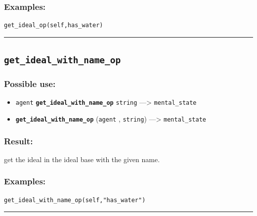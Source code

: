 \documentclass[]{book}
\providecommand{\tightlist}{%
  \setlength{\itemsep}{0pt}\setlength{\parskip}{0pt}}
\theoremstyle{definition}
\theoremstyle{definition}
\theoremstyle{definition}
\theoremstyle{remark}
\begin{document}
\subsubsection{Examples:}\label{examples-156}

\begin{verbatim}
get_ideal_op(self,has_water) 
\end{verbatim}

\begin{center}\rule{0.5\linewidth}{\linethickness}\end{center}

\subsection{\texorpdfstring{\texttt{get\_ideal\_with\_name\_op}}{get\_ideal\_with\_name\_op}}\label{get_ideal_with_name_op}

\subsubsection{Possible use:}\label{possible-use-210}

\begin{itemize}
\tightlist
\item
  \texttt{agent} \textbf{\texttt{get\_ideal\_with\_name\_op}}
  \texttt{string} ---\textgreater{} \texttt{mental\_state}
\item
  \textbf{\texttt{get\_ideal\_with\_name\_op}} (\texttt{agent} ,
  \texttt{string}) ---\textgreater{} \texttt{mental\_state}
\end{itemize}

\subsubsection{Result:}\label{result-204}

get the ideal in the ideal base with the given name.

\subsubsection{Examples:}\label{examples-157}

\begin{verbatim}
get_ideal_with_name_op(self,"has_water") 
\end{verbatim}

\begin{center}\rule{0.5\linewidth}{\linethickness}\end{center}
\end{document}
